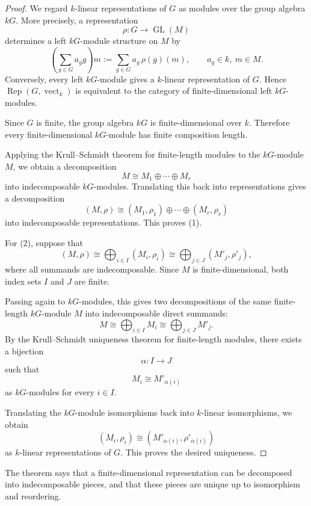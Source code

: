 \begin{proof}
    We regard \(k\)-linear representations of \(G\) as modules over the group
    algebra \(kG\). More precisely, a representation
    \[
        \rho:G\longrightarrow \operatorname{GL}(M)
    \]
    determines a left \(kG\)-module structure on \(M\) by
    \[
        \left(\sum_{g\in G} a_g g\right)m
        :=
        \sum_{g\in G} a_g\,\rho(g)(m),
        \qquad a_g\in k,\ m\in M.
    \]
    Conversely, every left \(kG\)-module gives a \(k\)-linear representation of
    \(G\). Hence \(\operatorname{Rep}(G,\operatorname{vect}_k)\) is equivalent to
    the category of finite-dimensional left \(kG\)-modules.

    Since \(G\) is finite, the group algebra \(kG\) is finite-dimensional over
    \(k\). Therefore every finite-dimensional \(kG\)-module has finite
    composition length.

    Applying the Krull--Schmidt theorem for finite-length modules to the
    \(kG\)-module \(M\), we obtain a decomposition
    \[
        M\cong M_1\oplus\cdots\oplus M_r
    \]
    into indecomposable \(kG\)-modules. Translating this back into
    representations gives a decomposition
    \[
        (M,\rho)
        \cong
        (M_1,\rho_1)\oplus\cdots\oplus(M_r,\rho_r)
    \]
    into indecomposable representations. This proves \textup{(1)}.

    For \textup{(2)}, suppose that
    \[
        (M,\rho)
        \cong
        \bigoplus_{i\in I}(M_i,\rho_i)
        \cong
        \bigoplus_{j\in J}(M'_j,\rho'_j),
    \]
    where all summands are indecomposable. Since \(M\) is finite-dimensional,
    both index sets \(I\) and \(J\) are finite.

    Passing again to \(kG\)-modules, this gives two decompositions of the same
    finite-length \(kG\)-module \(M\) into indecomposable direct summands:
    \[
        M\cong \bigoplus_{i\in I}M_i
        \cong
        \bigoplus_{j\in J}M'_j.
    \]
    By the Krull--Schmidt uniqueness theorem for finite-length modules, there
    exists a bijection
    \[
        \alpha:I\longrightarrow J
    \]
    such that
    \[
        M_i\cong M'_{\alpha(i)}
    \]
    as \(kG\)-modules for every \(i\in I\).

    Translating the \(kG\)-module isomorphisms back into 
    \(k\)-linear isomorphisms, we obtain
    \[
        (M_i,\rho_i)
        \cong
        (M'_{\alpha(i)},\rho'_{\alpha(i)})
    \]
    as \(k\)-linear representations of \(G\). This proves the desired uniqueness.
\end{proof}

\begin{remark}
    The theorem says that a finite-dimensional representation can be decomposed
    into indecomposable pieces, and that these pieces are unique up to
    isomorphism and reordering.
\end{remark}
